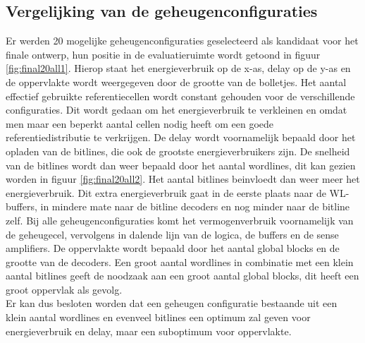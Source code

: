 \subsection{Vergelijking van de geheugenconfiguraties}
Er werden 20 mogelijke geheugenconfiguraties geselecteerd als kandidaat voor het finale ontwerp, hun positie in de evaluatieruimte wordt getoond in figuur \ref{fig:final20all1}. Hierop staat het energieverbruik op de x-as, delay op de y-as en de oppervlakte wordt weergegeven door de grootte van de bolletjes. Het aantal effectief gebruikte referentiecellen wordt constant gehouden voor de verschillende configuraties. Dit wordt gedaan om het energieverbruik te verkleinen en omdat men maar een beperkt aantal cellen nodig heeft om een goede referentiedistributie te verkrijgen. De delay wordt voornamelijk bepaald door het opladen van de bitlines, die ook de grootste energieverbruikers zijn. De snelheid van de bitlines wordt dan weer bepaald door het aantal wordlines, dit kan gezien worden in figuur \ref{fig:final20all2}. Het aantal bitlines beinvloedt dan weer meer het energieverbruik. Dit extra energieverbruik gaat in de eerste plaats naar de WL-buffers, in mindere mate naar de bitline decoders en nog minder naar de bitline zelf. Bij alle geheugenconfiguraties komt het vermogenverbruik voornamelijk van de geheugecel, vervolgens in dalende lijn van de logica, de buffers en de sense amplifiers. De oppervlakte wordt bepaald door het aantal global blocks en de grootte van de decoders. Een groot aantal wordlines in combinatie met een klein aantal bitlines geeft de noodzaak aan een groot aantal global blocks, dit heeft een groot oppervlak als gevolg.\\
Er kan dus besloten worden dat een geheugen configuratie bestaande uit een klein aantal wordlines en evenveel bitlines een optimum zal geven voor energieverbruik en delay, maar een suboptimum voor oppervlakte.


